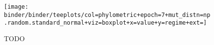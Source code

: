 \begin{figure*}
  \centering
  \texttt{[image: binder/binder/teeplots/col=phylometric+epoch=7+mut\_distn=np.random.standard\_normal+viz=boxplot+x=value+y=regime+ext=]}
  \caption{TODO}
  \label{fig:perfect-tree-phylometrics}
\end{figure*}
